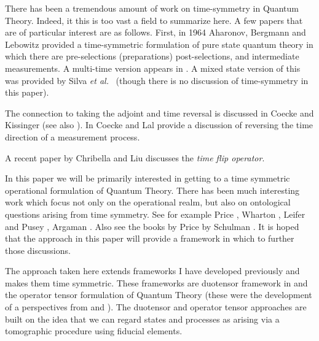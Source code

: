 \documentclass[10pt]{article}
\begin{document}
There has been a tremendous amount of work on time-symmetry in Quantum Theory.  Indeed, it this is too vast a field to summarize here.  A few papers that are of particular interest are as follows. First, in 1964 Aharonov, Bergmann and Lebowitz \cite{aharonov1964time} provided a time-symmetric formulation of pure state quantum theory in which there are pre-selections (preparations) post-selections, and intermediate measurements.  A multi-time version appears in \cite{aharonov2009multiple}.    A mixed state version of this was provided by Silva {\it et al.}\ \cite{silva2014pre} (though there is no discussion of time-symmetry in this paper).

The connection to taking the adjoint and time reversal is discussed in Coecke and Kissinger \cite{coecke2018picturing} (see also \cite{quant-ph/0402014,coecke2014logic}).
In \cite{coecke2012time} Coecke and Lal  provide a discussion of reversing the time direction of a measurement process.

A recent paper by Chribella and Liu \cite{2012.03859} discusses the \emph{time flip operator}.


In this paper we will be primarily interested in getting to a time symmetric operational formulation of Quantum Theory.   There has been much interesting work which focus not only on the operational realm, but also on ontological questions arising from time symmetry.  See for example Price \cite{price2012does}, Wharton \cite{wharton2018new, wharton2020colloquium}, Leifer and Pusey \cite{leifer2017time},  Argaman \cite{argaman2021quantum}.   Also see the books by Price \cite{price1997time} by Schulman \cite{schulman1997time}.  It is hoped that the approach in this paper will provide a framework in which to further those discussions.

The approach taken here extends frameworks I have developed previously and makes them time symmetric.  These frameworks are duotensor framework in \cite{hardy2013formalism} and the operator tensor formulation of Quantum Theory   \cite{hardy2011reformulating, hardy2012operator} (these were the development of a perspectives from \cite{hardy2001quantum} and \cite{hardy2005probability, hardy2007towards}).  The duotensor and operator tensor approaches are built on the idea that we can regard states and processes as arising via a tomographic procedure using fiducial elements.
\end{document}
